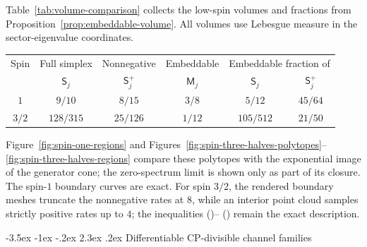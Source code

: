 \documentclass[twoside,10pt]{article}
\makeatletter
\numberwithin{equation}{section}
\theoremstyle{slbody}
\theoremstyle{definition}
\theoremstyle{remark}
\renewcommand{\section}{%
  \@startsection{section}{1}{\z@}%
    {-3.5ex \@plus -1ex \@minus -.2ex}%
    {2.3ex \@plus .2ex}%
    {\normalfont\large\bfseries}}
\renewcommand{\eqref}[1]{%
  \textup{{\normalfont(\oldstylenums{\ref{#1}}}\normalfont)}}
\makeatother
\begin{document}
Table~\ref{tab:volume-comparison} collects the low-spin volumes and
fractions from Proposition~\ref{prop:embeddable-volume}.  All volumes use
Lebesgue measure in the sector-eigenvalue coordinates.
\begin{center}
\begin{minipage}{\textwidth}
\centering\small
\begin{tabular}{c c c c c c}
\hline
Spin & Full simplex & Nonnegative & Embeddable
 & \multicolumn{2}{c}{Embeddable fraction of}\\
 & \(\mathsf S_j\) & \(\mathsf S_j^+\) & \(\mathsf M_j\)
 & \(\mathsf S_j\) & \(\mathsf S_j^+\)\\ \hline
\(1\) & \(9/10\) & \(8/15\) & \(3/8\) & \(5/12\) & \(45/64\)\\
\(3/2\) & \(128/315\) & \(25/126\) & \(1/12\) & \(105/512\) & \(21/50\)\\ \hline
\end{tabular}
\captionsetup{hypcap=false}
\label{tab:volume-comparison}
\end{minipage}
\end{center}

Figure~\ref{fig:spin-one-regions} and
Figures~\ref{fig:spin-three-halves-polytopes}--\ref{fig:spin-three-halves-regions}
compare these polytopes with the
exponential image of the generator cone; the zero-spectrum limit is
shown only as part of its closure.  The spin-\(1\) boundary curves are
exact.  For spin \(3/2\), the rendered boundary meshes truncate the
nonnegative rates at \(8\), while an interior point cloud samples strictly
positive rates up to \(4\); the inequalities
\eqref{eq:spin-three-halves-facet-one}--\eqref{eq:spin-three-halves-facet-three}
remain the exact description.

\clearpage

\clearpage

\section{Differentiable CP-divisible channel families}
\end{document}
